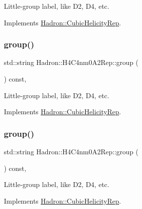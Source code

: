 Little-\/group label, like D2, D4, etc. 

Implements \mbox{\hyperlink{structHadron_1_1CubicHelicityRep_a101a7d76cd8ccdad0f272db44b766113}{Hadron\+::\+Cubic\+Helicity\+Rep}}.

\mbox{\label{structHadron_1_1H4C4nm0A2Rep_a9424437b4e8f2230697222a77fe7b3e0}} 
\subsubsection{\texorpdfstring{group()}{group()}\hspace{0.1cm}{\footnotesize\ttfamily [2/3]}}
{\footnotesize\ttfamily std\+::string Hadron\+::\+H4\+C4nm0\+A2\+Rep\+::group (\begin{DoxyParamCaption}{ }\end{DoxyParamCaption}) const\hspace{0.3cm}{\ttfamily [inline]}, {\ttfamily [virtual]}}

Little-\/group label, like D2, D4, etc. 

Implements \mbox{\hyperlink{structHadron_1_1CubicHelicityRep_a101a7d76cd8ccdad0f272db44b766113}{Hadron\+::\+Cubic\+Helicity\+Rep}}.

\mbox{\label{structHadron_1_1H4C4nm0A2Rep_a9424437b4e8f2230697222a77fe7b3e0}} 
\subsubsection{\texorpdfstring{group()}{group()}\hspace{0.1cm}{\footnotesize\ttfamily [3/3]}}
{\footnotesize\ttfamily std\+::string Hadron\+::\+H4\+C4nm0\+A2\+Rep\+::group (\begin{DoxyParamCaption}{ }\end{DoxyParamCaption}) const\hspace{0.3cm}{\ttfamily [inline]}, {\ttfamily [virtual]}}

Little-\/group label, like D2, D4, etc. 

Implements \mbox{\hyperlink{structHadron_1_1CubicHelicityRep_a101a7d76cd8ccdad0f272db44b766113}{Hadron\+::\+Cubic\+Helicity\+Rep}}.

